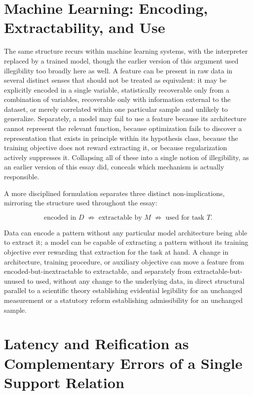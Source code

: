 \documentclass[11pt]{article}
\begin{document}
\section{Machine Learning: Encoding, Extractability, and Use}

The same structure recurs within machine learning systems, with the interpreter replaced by a trained model, though the earlier version of this argument used illegibility too broadly here as well. A feature can be present in raw data in several distinct senses that should not be treated as equivalent: it may be explicitly encoded in a single variable, statistically recoverable only from a combination of variables, recoverable only with information external to the dataset, or merely correlated within one particular sample and unlikely to generalize. Separately, a model may fail to use a feature because its architecture cannot represent the relevant function, because optimization fails to discover a representation that exists in principle within its hypothesis class, because the training objective does not reward extracting it, or because regularization actively suppresses it. Collapsing all of these into a single notion of illegibility, as an earlier version of this essay did, conceals which mechanism is actually responsible.

A more disciplined formulation separates three distinct non-implications, mirroring the structure used throughout the essay:

\[
\text{encoded in } D \;\nRightarrow\; \text{extractable by } M \;\nRightarrow\; \text{used for task } T.
\]

Data can encode a pattern without any particular model architecture being able to extract it; a model can be capable of extracting a pattern without its training objective ever rewarding that extraction for the task at hand. A change in architecture, training procedure, or auxiliary objective can move a feature from encoded-but-inextractable to extractable, and separately from extractable-but-unused to used, without any change to the underlying data, in direct structural parallel to a scientific theory establishing evidential legibility for an unchanged measurement or a statutory reform establishing admissibility for an unchanged sample.

\section{Latency and Reification as Complementary Errors of a Single Support Relation}
\end{document}
